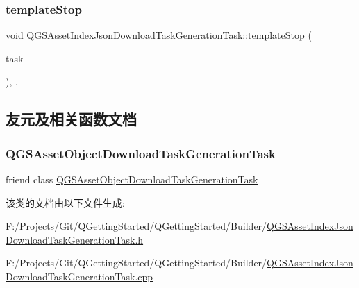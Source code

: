 \subsubsection{\texorpdfstring{template\+Stop}{templateStop}}
{\footnotesize\ttfamily void Q\+G\+S\+Asset\+Index\+Json\+Download\+Task\+Generation\+Task\+::template\+Stop (\begin{DoxyParamCaption}\item[{\mbox{\hyperlink{class_q_g_s_task}{Q\+G\+S\+Task}} $\ast$}]{task }\end{DoxyParamCaption})\hspace{0.3cm}{\ttfamily [protected]}, {\ttfamily [virtual]}, {\ttfamily [slot]}}



\subsection{友元及相关函数文档}
\mbox{\label{class_q_g_s_asset_index_json_download_task_generation_task_aec6e1c8ab10577e704203a6195bad762}} 
\subsubsection{\texorpdfstring{Q\+G\+S\+Asset\+Object\+Download\+Task\+Generation\+Task}{QGSAssetObjectDownloadTaskGenerationTask}}
{\footnotesize\ttfamily friend class \mbox{\hyperlink{class_q_g_s_asset_object_download_task_generation_task}{Q\+G\+S\+Asset\+Object\+Download\+Task\+Generation\+Task}}\hspace{0.3cm}{\ttfamily [friend]}}



该类的文档由以下文件生成\+:\begin{DoxyCompactItemize}
\item 
F\+:/\+Projects/\+Git/\+Q\+Getting\+Started/\+Q\+Getting\+Started/\+Builder/\mbox{\hyperlink{_q_g_s_asset_index_json_download_task_generation_task_8h}{Q\+G\+S\+Asset\+Index\+Json\+Download\+Task\+Generation\+Task.\+h}}\item 
F\+:/\+Projects/\+Git/\+Q\+Getting\+Started/\+Q\+Getting\+Started/\+Builder/\mbox{\hyperlink{_q_g_s_asset_index_json_download_task_generation_task_8cpp}{Q\+G\+S\+Asset\+Index\+Json\+Download\+Task\+Generation\+Task.\+cpp}}\end{DoxyCompactItemize}

